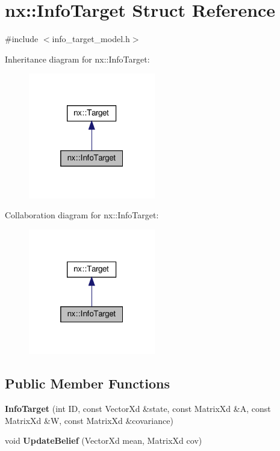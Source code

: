 \hypertarget{structnx_1_1InfoTarget}{}\section{nx\+:\+:Info\+Target Struct Reference}
\label{structnx_1_1InfoTarget}


{\ttfamily \#include $<$info\+\_\+target\+\_\+model.\+h$>$}



Inheritance diagram for nx\+:\+:Info\+Target\+:
\nopagebreak
\begin{figure}[H]
\begin{center}
\leavevmode
\includegraphics[width=157pt]{structnx_1_1InfoTarget__inherit__graph}
\end{center}
\end{figure}


Collaboration diagram for nx\+:\+:Info\+Target\+:
\nopagebreak
\begin{figure}[H]
\begin{center}
\leavevmode
\includegraphics[width=157pt]{structnx_1_1InfoTarget__coll__graph}
\end{center}
\end{figure}
\subsection*{Public Member Functions}
\begin{DoxyCompactItemize}
\item 
\mbox{\label{structnx_1_1InfoTarget_a00952ad1d04afb571a3f5c71447f7bb3}} 
{\bfseries Info\+Target} (int ID, const Vector\+Xd \&state, const Matrix\+Xd \&A, const Matrix\+Xd \&W, const Matrix\+Xd \&covariance)
\item 
\mbox{\label{structnx_1_1InfoTarget_a169b44c7fdef239d040b1438ee881b48}} 
void {\bfseries Update\+Belief} (Vector\+Xd mean, Matrix\+Xd cov)
\end{DoxyCompactItemize}
